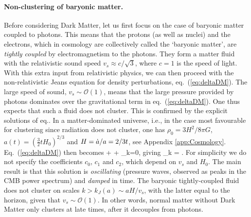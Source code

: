 \paragraph{Non-clustering of baryonic matter.} Before considering Dark Matter, let us first focus on the case of baryonic matter coupled to photons.
This means that the protons (as well as nuclei) and the electrons, which in cosmology are collectively called the `baryonic matter', 
are {\em tightly coupled} by electromagnetism to the photons. They form a matter fluid with the relativistic sound speed $v_s \approx  c/\sqrt{3}$, where $c=1$ is the speed of light.
With this extra input from relativistic physics, we can then proceed with the non-relativistic Jeans equation for density perturbations, eq.~(\ref{eq:deltaDM}).
The large speed of sound, $v_s \sim\mathcal{O}(1)$,  means that the large pressure provided by photons dominates over the gravitational term in eq.~(\ref{eq:deltaDM}).
One thus expects that such a fluid does not cluster.
This is confirmed by the explicit solutions of eq..
In a matter-dominated universe, i.e., in the case most favourable for clustering since radiation does not cluster, one has 
$\rho_0 = 3H^2/8\pi G$, 
$a(t)=(\frac32 tH_0)^{2/3}$ and 
$H = \dot a/a = 2/ 3t$, see Appendix \ref{app:Cosmology}. Eq.~(\ref{eq:deltaDM}) then becomes
\beq\label{eq:acoustic}
 +   +   \delta_k=0,  \qquad\hbox{giving}\qquad 
\delta_k = .
\eeq
For simplicity we do not specify the coefficients $c_0$, $c_1$ and $c_2$, which depend on $v_s$ and $H_0$.
The main result is that this solution is {\em oscillating} 
(pressure waves, observed as peaks in the CMB power spectrum)
and {\em damped} in time. 
The baryonic tightly-coupled fluid does not cluster on scales $k> k_J (a) \sim aH/v_s$, with the latter equal to the horizon,
given that $v_s\sim \mathcal{O}(1)$.
In other words, normal matter without Dark Matter only clusters at late times, after it decouples from photons.


